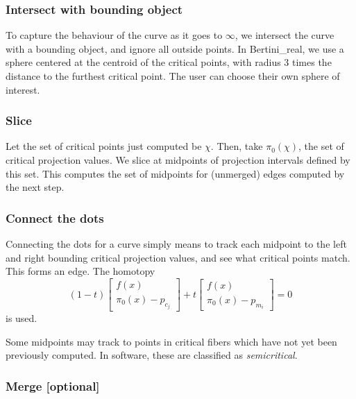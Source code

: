 \subsubsection{Intersect with bounding object}

To capture the behaviour of the curve as it goes to $\infty$, we intersect the curve with a bounding object, and ignore all outside points.  In Bertini\_real, we use a sphere centered at the centroid of the critical points, with radius 3 times the distance to the furthest critical point.  The user can choose their own sphere of interest.


\subsubsection{Slice}


Let the set of critical points just computed be $\chi$.  Then, take $\pi_0(\chi)$, the set of critical projection values.  We slice at midpoints of projection intervals defined by this set.  This computes the set of midpoints for (unmerged) edges computed by the next step.


\subsubsection{Connect the dots}
\label{sec:connect_curve}


Connecting the dots for a curve simply means to track each midpoint to the left and right bounding critical projection values, and see what critical points match.  This forms an edge.  The homotopy 
\begin{equation}
(1-t)
\begin{bmatrix}
f(x) \\
\pi_0(x) - p_{c_j}
\end{bmatrix}
+t
\begin{bmatrix}
f(x) \\
\pi_0(x) - p_{m_i}
\end{bmatrix} = 0\label{eqn:projvalmove}
\end{equation}
is used.

Some midpoints may track to points in critical fibers which have not yet been previously computed.  In software, these are classified as {\em semicritical}.

\subsubsection{Merge [optional]}

